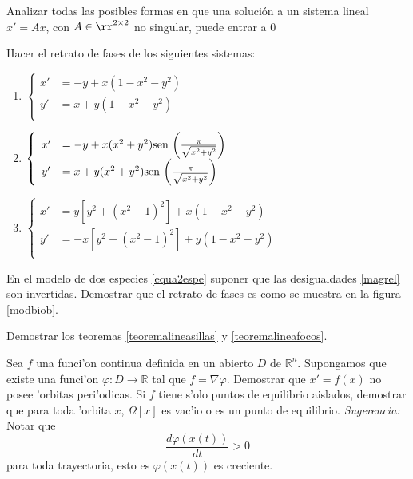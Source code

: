 \begin{ejercicio} Analizar todas las posibles formas en que una
solución a un sistema lineal $x'=Ax$, con $A\in\rr^{2\times 2}$ no
singular, puede entrar a $0$
\end{ejercicio}

\begin{ejercicio} Hacer el retrato de fases de los siguientes
sistemas:
\begin{enumerate}
\item   $\left\{%
\begin{array}{ll}
 x'&=-y+x(1-x^2-y^2)\\
    y'&=x+y(1-x^2-y^2)\\
\end{array}%
\right.$
\item $
\left\{
    \begin{array}{ll}
  x'&=-y+x(x^2+y^2)\hbox{sen }
  \bigg(\frac{\pi}{\sqrt{x^2+y^2}}\bigg)\\
    y'&=x+y(x^2+y^2)\hbox{sen
 }\bigg(\frac{\pi}{\sqrt{x^2+y^2}}\bigg)\\
 \end{array}
 \right.$

\item $
   \left\{%
 \begin{array}{ll}
  x'&=y[y^2+(x^2-1)^2]+x(1-x^2-y^2)\\
     y'&=-x[y^2+(x^2-1)^2]+y(1-x^2-y^2)\\
 \end{array}%
\right.
$
\end{enumerate}
\end{ejercicio}

\begin{ejercicio} En el modelo de dos especies \eqref{equa2espe}
suponer que las desigualdades \eqref{magrel} son invertidas.
Demostrar que el retrato de fases es como se muestra en la figura
\ref{modbiob}.

\end{ejercicio}



\begin{ejercicio} Demostrar los teoremas \ref{teoremalineasillas}
y \ref{teoremalineafocos}.
\end{ejercicio}



\begin{ejercicio} Sea $f$ una funci'on continua definida en un
abierto $D$ de $\mathbb{R}^n$. Supongamos que existe una funci'on
$\varphi:D\to\mathbb{R}$ tal que $f=\nabla\varphi$. Demostrar que
$x'=f(x)$ no posee 'orbitas peri'odicas. Si $f$ tiene s'olo puntos
de equilibrio aislados, demostrar que para toda 'orbita $x$,
$\Omega[x]$ es vac'io o es un punto de equilibrio.
\emph{Sugerencia:} Notar que
\[
    \frac{d\varphi(x(t))}{dt}>0
\]
para toda trayectoria, esto es $\varphi(x(t))$ es creciente.

\end{ejercicio}

